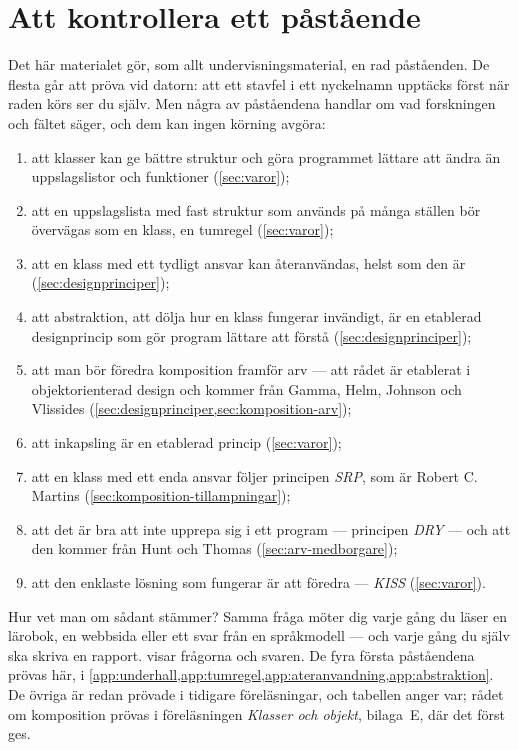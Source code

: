 \chapter{Att kontrollera ett påstående}
\label{app:verifiera-tillampningar}

Det här materialet gör, som allt undervisningsmaterial, en rad
påståenden.  De flesta går att pröva vid datorn: att ett stavfel i ett
nyckelnamn upptäcks först när raden körs ser du själv.  Men några av
påståendena handlar om vad forskningen och fältet säger, och dem kan
ingen körning avgöra:
\begin{enumerate}
  \item att klasser kan ge bättre struktur och göra programmet lättare
    att ändra än uppslagslistor och funktioner (\cref{sec:varor});
  \item att en uppslagslista med fast struktur som används på många
    ställen bör övervägas som en klass, en tumregel
    (\cref{sec:varor});
  \item att en klass med ett tydligt ansvar kan återanvändas, helst som
    den är (\cref{sec:designprinciper});
  \item att abstraktion, att dölja hur en klass fungerar invändigt, är
    en etablerad designprincip som gör program lättare att förstå
    (\cref{sec:designprinciper});
  \item att man bör föredra komposition framför arv --- att rådet är
    etablerat i objektorienterad design och kommer från Gamma, Helm,
    Johnson och Vlissides (\cref{sec:designprinciper,sec:komposition-arv});
  \item att inkapsling är en etablerad princip
    (\cref{sec:varor});
  \item att en klass med ett enda ansvar följer principen \emph{SRP},
    som är Robert C. Martins (\cref{sec:komposition-tillampningar});
  \item att det är bra att inte upprepa sig i ett program --- principen
    \emph{DRY} --- och att den kommer från Hunt och Thomas
    (\cref{sec:arv-medborgare});
  \item att den enklaste lösning som fungerar är att föredra ---
    \emph{KISS} (\cref{sec:varor}).
\end{enumerate}
Hur vet man om sådant stämmer?  Samma fråga möter dig varje gång du läser
en lärobok, en webbsida eller ett svar från en språkmodell --- och varje
gång du själv ska skriva en rapport.
 visar frågorna och svaren.  De
fyra första påståendena prövas här, i
\cref{app:underhall,app:tumregel,app:ateranvandning,app:abstraktion}.
De övriga är redan prövade i tidigare föreläsningar, och tabellen anger
var; rådet om komposition prövas i föreläsningen \emph{Klasser och
objekt}, bilaga~E, där det först ges.

